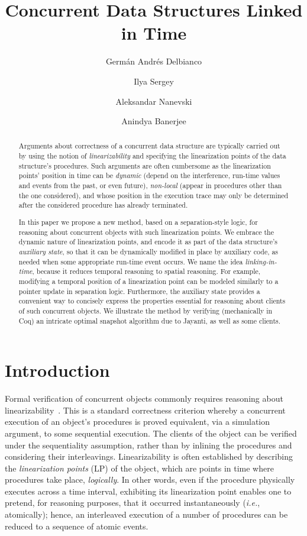 \documentclass[a4paper,UKenglish]{lipics-v2016}
\title{Concurrent Data Structures Linked in Time}
\author[1,2]{Germ\'{a}n Andr\'{e}s Delbianco}
\author[3]{Ilya Sergey}
\author[1]{Aleksandar Nanevski}
\author[1]{Anindya Banerjee}
\affil[1]{IMDEA Software Institute, Madrid, Spain\\
  {\texttt{\{german.delbianco,
      aleks.nanevski,anindya.banerjee\}@imdea.org}}}
\affil[2]{Universidad Polit\'{e}cnica de Madrid, Spain}
\affil[3]{University College London, United Kingdom\\
  {\texttt{i.sergey@ucl.ac.uk}}}
\newcommand{\ie}{\emph{i.e.}\xspace}
\theoremstyle{definition}
\begin{document}
\maketitle

\begin{abstract}
Arguments about correctness of a concurrent data structure are
typically carried out by using the notion of \emph{linearizability}
and specifying the linearization points of the data structure's
procedures.
%
Such arguments are often cumbersome as the linearization points'
position in time can be \emph{dynamic} (depend on the interference,
run-time values and events from the past, or even future),
\emph{non-local} (appear in procedures other than the one considered),
and whose position in the execution trace may only be determined after
the considered procedure has already terminated.

In this paper we propose a new method, based on a separation-style
logic, for reasoning about concurrent objects with such linearization
points. We embrace the dynamic nature of linearization points, and
encode it as part of the data structure's \emph{auxiliary state}, so
that it can be dynamically modified in place by auxiliary code, as
needed when some appropriate run-time event occurs.
%
We name the idea \emph{linking-in-time}, because it reduces temporal
reasoning to spatial reasoning. For example, modifying a temporal
position of a linearization point can be modeled similarly to a
pointer update in separation logic.
%
Furthermore, the auxiliary state provides a convenient way to
concisely express the properties essential for reasoning about clients
of such concurrent objects.
%
We illustrate the method by verifying (mechanically in Coq) an
intricate optimal snapshot algorithm due to Jayanti, as well as some
clients.
\end{abstract}

%


\section{Introduction}
\label{sc:intro} 
   
Formal verification of concurrent objects commonly requires reasoning
about linearizability~\cite{HerlihyW+TOPLAS90}. This is a standard
correctness criterion whereby a concurrent execution of an object's
procedures is proved equivalent, via a simulation argument, to some
sequential execution. The clients of the object can be verified under
the sequentiality assumption, rather than by inlining the procedures
and considering their interleavings. Linearizability is often
established by describing the \emph{linearization points} (LP) of the
object, which are points in time where procedures take place,
\emph{logically}.  In other words, even if the procedure physically
executes across a time interval, exhibiting its linearization point
enables one to pretend, for reasoning purposes, that it occurred
instantaneously (\ie, atomically); hence, an interleaved execution of
a number of procedures can be reduced to a sequence of atomic events.
\end{document}
